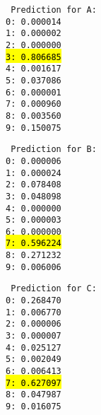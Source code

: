 \begin{latin}
	\noindent\begin{multicols}{3}
		\texttt{%
			Prediction for A:\\
			0: 0.000014\\
			1: 0.000002\\
			2: 0.000000\\
			\hl{3: 0.806685}\\
			4: 0.001617\\
			5: 0.037086\\
			6: 0.000001\\
			7: 0.000960\\
			8: 0.003560\\
			9: 0.150075
		}
		
		\vfill %
		
		\texttt{%
			Prediction for B:\\
			0: 0.000006\\
			1: 0.000024\\
			2: 0.078408\\
			3: 0.048098\\
			4: 0.000000\\
			5: 0.000003\\
			6: 0.000000\\
			\hl{7: 0.596224}\\
			8: 0.271232\\
			9: 0.006006
		}
		
		\vfill %
		
		\texttt{%
			Prediction for C:\\
			0: 0.268470\\
			1: 0.006770\\
			2: 0.000006\\
			3: 0.000007\\
			4: 0.025127\\
			5: 0.002049\\
			6: 0.006413\\
			\hl{7: 0.627097}\\
			8: 0.047987\\
			9: 0.016075
		}
	\end{multicols}
\end{latin}




